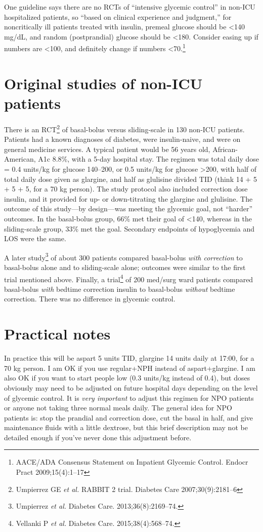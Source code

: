 \documentclass{tufte-handout}
\begin{document}
One guideline says there are no RCTs of ``intensive glycemic control''
in non-ICU hospitalized patients, so ``based on clinical experience
and judgment,'' for noncritically ill patients treated with insulin,
premeal glucose should be <140 mg/dL, and random (postprandial)
glucose should be <180. Consider easing up if numbers are <100, and
definitely change if numbers <70.\footnote{AACE/ADA Consensus
  Statement on Inpatient Glycemic Control. Endocr Pract
  2009;15(4):1--17}

\section{Original studies of non-ICU patients}

There is an RCT\footnote{Umpierrez GE \emph{et al.} RABBIT 2 trial.
  Diabetes Care 2007;30(9):2181--6} of basal-bolus versus
sliding-scale in 130 non-ICU patients. Patients had a known diagnoses
of diabetes, were insulin-naive, and were on general medicine
services. A typical patient would be 56 years old, African-American,
A1c 8.8\%, with a 5-day hospital stay. The regimen was total daily
dose = 0.4 units/kg for glucose 140--200, or 0.5 units/kg for glucose
>200, with half of total daily dose given as glargine, and half as
glulisine divided TID (think 14 + 5 + 5 + 5, for a 70 kg person). The
study protocol also included correction dose insulin, and it provided
for up- or down-titrating the glargine and glulisine. The outcome of
this study---by design---was meeting the glycemic goal, not ``harder''
outcomes. In the basal-bolus group, 66\% met their goal of <140,
whereas in the sliding-scale group, 33\% met the goal. Secondary
endpoints of hypoglycemia and LOS were the same.

A later study\footnote{Umpierrez \emph{et al.} Diabetes Care.
  2013;36(8):2169--74.} of about 300 patients compared
basal-bolus \emph{with correction} to basal-bolus alone and to
sliding-scale alone; outcomes were similar to the first trial
mentioned above. Finally, a trial\footnote{Vellanki P \emph{et al.}
  Diabetes Care. 2015;38(4):568--74.} of 200 med/surg ward patients
compared basal-bolus \emph{with} bedtime correction insulin to
basal-bolus \emph{without} bedtime correction. There was no difference
in glycemic control.

\section{Practical notes}

In practice this will be aspart 5 units TID, glargine 14 units daily
at 17:00, for a 70 kg person. I am OK if you use regular+NPH instead of
aspart+glargine. I am also OK if you want to start people low (0.3
units/kg instead of 0.4), but doses obviously may need to be adjusted
on future hospital days depending on the level of glycemic control. It
is \emph{very important} to adjust this regimen for NPO patients or
anyone not taking three normal meals daily. The general idea for NPO
patients is: stop the prandial and correction dose, cut the basal in
half, and give maintenance fluids with a little dextrose, but this
brief description may not be detailed enough if you've never done this
adjustment before.
\end{document}
